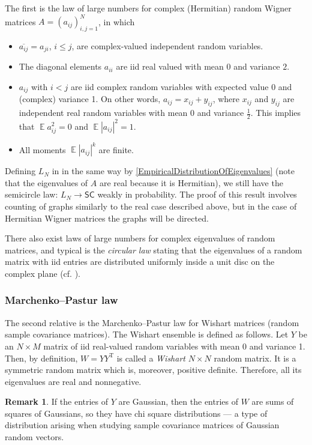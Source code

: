 \documentclass[letterpaper,11pt,oneside,reqno]{amsart}
\numberwithin{equation}{section}
\newcommand{\SC}{\mathsf{SC}}
\DeclareMathOperator{\EE}{\mathbb{E}}
\theoremstyle{definition}
\newtheorem{remark}[proposition]{Remark}
\begin{document}
The first is the law of large numbers for complex (Hermitian) random Wigner
matrices $A= ( a_{ i j } )_{i,j=1}^{N}$, in which
\begin{itemize}
	\item $ \overline{ a_{ i j } } = a_{ j i } $, $i\le j$,
	are complex-valued independent random variables.
	\item The diagonal elements
	$ a_{ i i } $ are iid real valued with mean $0$ and variance $2$.
	\item $ a_{ i j } $ with $ i < j $ are iid complex random variables
	with expected value 0 and (complex) variance 1.
	On other words, $a_{ij}=x_{ij}+y_{ij}$, where $x_{ij}$ and $y_{ij}$ are independent
	real random variables with mean $0$ and variance $\frac12$. This implies that 
	$\EE a_{ij}^{2}=0$ and $\EE |a_{ij}|^{2}=1$.
	\item All moments $\EE|a_{ij}|^{k}$ are finite.
\end{itemize}
Defining $L_N$ in in the same way by \eqref{EmpiricalDistributionOfEigenvalues}
(note that the eigenvalues of $A$ are real because it is Hermitian),
we still have the semicircle law: 
$ L_N \rightarrow \SC $ weakly in probability. The proof of this result involves counting 
of graphs similarly to the real case described above, but in the case of Hermitian Wigner matrices
the graphs will be directed.

There also exist laws of large numbers
for complex eigenvalues of random matrices,
and typical is the \emph{circular law} stating
that the eigenvalues of a random matrix with iid 
entries are distributed uniformly inside a unit disc on the 
complex plane (cf. ).



\subsubsection{Marchenko--Pastur law} %
\label{ssub:marchenko_pastur_law}

The second relative is the Marchenko--Pastur law \cite{MarchenkoPastur}
for Wishart matrices (random sample covariance matrices). The Wishart ensemble is defined as follows.
Let $ Y $ be an $ N \times M $ matrix of iid real-valued random variables with mean 0 and variance 1. 
Then, by definition, $ W = Y Y^\text{T} $ is called a \emph{Wishart} $ N \times N $ random matrix.
It is a symmetric random matrix which is, moreover, positive definite.
Therefore, all its eigenvalues are real and nonnegative.
\begin{remark}
	If the entries of $ Y $ are Gaussian, then the entries of $ W $ are sums of squares of Gaussians, 
	so they have chi square distributions --- a type of distribution
	arising when studying sample covariance matrices of Gaussian random vectors.
\end{remark}
\end{document}

